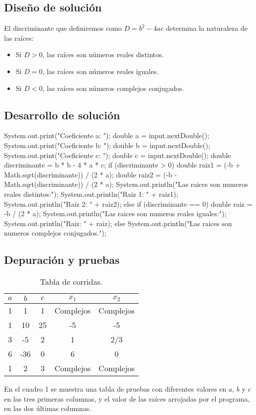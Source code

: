 \subsection{Diseño de solución}
El discriminante que definiremos como $ D = b^2 - 4ac$ determina la naturaleza de las raíces:
\begin{itemize}
    \item Si $D > 0$, las raíces son números reales distintos.
    \item Si $D = 0$, las raíces son números reales iguales.
    \item Si $D < 0$, las raíces son números complejos conjugados.
\end{itemize}

\subsection{Desarrollo de solución}

\begin{javaCode}

        System.out.print("Coeficiente a: ");
        double a = input.nextDouble();
        System.out.print("Coeficiente b: ");
        double b = input.nextDouble();
        System.out.print("Coeficiente c: ");
        double c = input.nextDouble();
        double discriminante = b * b - 4 * a * c;
        if (discriminante > 0) {
            double raiz1 = (-b + Math.sqrt(discriminante)) / (2 * a);
            double raiz2 = (-b - Math.sqrt(discriminante)) / (2 * a);
            System.out.println("Las raices son numeros reales distintos:");
            System.out.println("Raiz 1: " + raiz1);
            System.out.println("Raiz 2: " + raiz2);
        } else if (discriminante == 0) {
            double raiz = -b / (2 * a);
            System.out.println("Las raices son numeros reales iguales:");
            System.out.println("Raiz: " + raiz);
        } else {
            System.out.println("Las raices son numeros complejos conjugados.");
        }

\end{javaCode}

\subsection{Depuración y pruebas}

\begin{table}[!ht]
\label{T:equipos}
\begin{center}
\begin{tabular}{| c | c | c | c | c |}
\hline
\textbf{$a$} & \textbf{$b$} & \textbf{$c$} & \textbf{$x_1$} & \textbf{$x_2$} \\
\hline
1 & 1 & 1 & Complejos & Complejos \\
1 & 10 & 25 & -5 & -5 \\
3 & -5 & 2 & 1 & 2/3\\
6 & -36 & 0 & 6 & 0 \\
1 & 2 & 3 & Complejos & Complejos \\
\hline
\end{tabular}
\caption{Tabla de corridas.}
\end{center}
\end{table}

En el cuadro 1 se muestra una tabla de pruebas con diferentes valores en $a$, $b$ y $c$ en las tres primeras columnas, y el valor de las raíces arrojadas por el programa, en las dos últimas columnas.